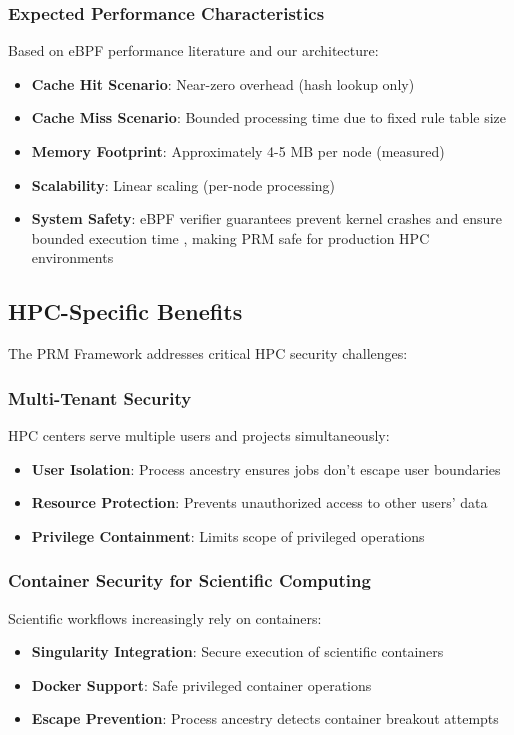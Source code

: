 \documentclass[conference]{IEEEtran}
\begin{document}
\subsubsection{Expected Performance Characteristics}
Based on eBPF performance literature \cite{hoiland2018express} and our architecture:
\begin{itemize}
\item \textbf{Cache Hit Scenario}: Near-zero overhead (hash lookup only)
\item \textbf{Cache Miss Scenario}: Bounded processing time due to fixed rule table size
\item \textbf{Memory Footprint}: Approximately 4-5 MB per node (measured)
\item \textbf{Scalability}: Linear scaling (per-node processing)
\item \textbf{System Safety}: eBPF verifier guarantees prevent kernel crashes and ensure bounded execution time \cite{nelson2017bpf}, making PRM safe for production HPC environments
\end{itemize}

\subsection{HPC-Specific Benefits}
The PRM Framework addresses critical HPC security challenges:

\subsubsection{Multi-Tenant Security}
HPC centers serve multiple users and projects simultaneously:
\begin{itemize}
\item \textbf{User Isolation}: Process ancestry ensures jobs don't escape user boundaries
\item \textbf{Resource Protection}: Prevents unauthorized access to other users' data
\item \textbf{Privilege Containment}: Limits scope of privileged operations
\end{itemize}

\subsubsection{Container Security for Scientific Computing}
Scientific workflows increasingly rely on containers:
\begin{itemize}
\item \textbf{Singularity Integration}: Secure execution of scientific containers
\item \textbf{Docker Support}: Safe privileged container operations
\item \textbf{Escape Prevention}: Process ancestry detects container breakout attempts
\end{itemize}
\end{document}
